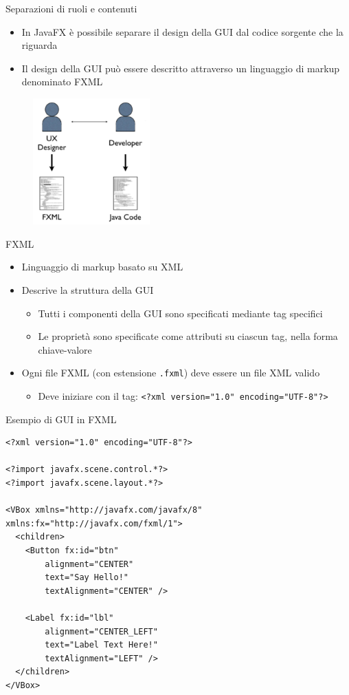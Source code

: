 \documentclass[presentation]{beamer}
\begin{document}
\begin{frame}{Separazioni di ruoli e contenuti}
\begin{itemize}\itemsep10pt
\item In JavaFX è possibile separare il design della GUI dal codice sorgente che la riguarda
\item Il design della GUI può essere descritto attraverso un linguaggio di markup denominato FXML
\end{itemize}
\begin{figure}
\includegraphics[width=0.4\textwidth]{img/soc.png}
\end{figure}
\end{frame}

\begin{frame}{FXML}
\begin{itemize}\itemsep20pt
\item Linguaggio di markup basato su XML
\item Descrive la struttura della GUI
\begin{itemize}
\item Tutti i componenti della GUI sono specificati mediante tag specifici
\item Le proprietà sono specificate come attributi su ciascun tag, nella forma chiave-valore
\end{itemize}
\item Ogni file FXML (con estensione \texttt{.fxml}) deve essere un file XML valido
\begin{itemize}
\item Deve iniziare con il tag: \texttt{<?xml version="1.0" encoding="UTF-8"?>}
\end{itemize}
\end{itemize}
\end{frame}

\begin{frame}[fragile]{Esempio di GUI in FXML}
\begin{lstlisting}
<?xml version="1.0" encoding="UTF-8"?>

<?import javafx.scene.control.*?>
<?import javafx.scene.layout.*?>

<VBox xmlns="http://javafx.com/javafx/8" xmlns:fx="http://javafx.com/fxml/1">
  <children>
    <Button fx:id="btn" 
    	alignment="CENTER"
    	text="Say Hello!"
    	textAlignment="CENTER" />
    
    <Label fx:id="lbl"
    	alignment="CENTER_LEFT"
    	text="Label Text Here!"
    	textAlignment="LEFT" />
  </children>
</VBox>
\end{lstlisting}
\end{frame}
\end{document}
